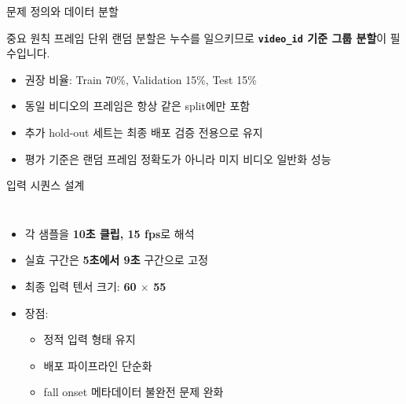 \documentclass[aspectratio=169]{beamer}
\begin{document}
\begin{frame}{문제 정의와 데이터 분할}
  \begin{block}{중요 원칙}
    프레임 단위 랜덤 분할은 누수를 일으키므로 \textbf{\texttt{video\_id} 기준 그룹 분할}이 필수입니다.
  \end{block}

  \begin{itemize}
    \item 권장 비율: Train 70\%, Validation 15\%, Test 15\%
    \item 동일 비디오의 프레임은 항상 같은 split에만 포함
    \item 추가 hold-out 세트는 최종 배포 검증 전용으로 유지
    \item 평가 기준은 랜덤 프레임 정확도가 아니라 미지 비디오 일반화 성능
  \end{itemize}
\end{frame}

\begin{frame}{입력 시퀀스 설계}
  \begin{columns}[T]
    \begin{itemize}
      \item 각 샘플을 \textbf{10초 클립, 15 fps}로 해석
      \item 실효 구간은 \textbf{5초에서 9초} 구간으로 고정
      \item 최종 입력 텐서 크기: \textbf{60 $\times$ 55}
      \item 장점:
      \begin{itemize}
        \item 정적 입력 형태 유지
        \item 배포 파이프라인 단순화
        \item fall onset 메타데이터 불완전 문제 완화
      \end{itemize}
    \end{itemize}

    \begin{center}
    \end{center}
  \end{columns}
\end{frame}
\end{document}
